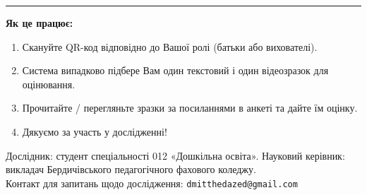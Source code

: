 \documentclass[11pt,a4paper]{article}
\begin{document}
\vfill

\noindent\rule{\linewidth}{0.4pt}

\vspace{4pt}

{\footnotesize\color{textsoft}
\textbf{Як це працює:}
\begin{enumerate}\setlength{\itemsep}{1pt}
  \item Скануйте QR-код відповідно до Вашої ролі (батьки або вихователі).
  \item Система випадково підбере Вам один текстовий і один відеозразок для оцінювання.
  \item Прочитайте / перегляньте зразки за посиланнями в анкеті та дайте їм оцінку.
  \item Дякуємо за участь у дослідженні!
\end{enumerate}}

\vspace{4pt}

{\scriptsize\color{accent2}
Дослідник: студент спеціальності 012 «Дошкільна освіта». Науковий керівник: викладач Бердичівського педагогічного фахового коледжу.\\
Контакт для запитань щодо дослідження: \texttt{dmitthedazed@gmail.com}}
\end{document}
